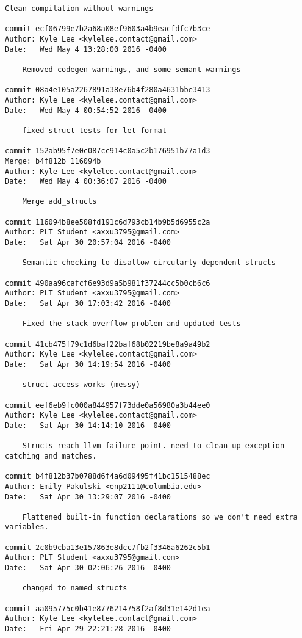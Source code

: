 \begin{lstlisting}[backgroundcolor=\color{white}]
    Clean compilation without warnings

commit ecf06799e7b2a68a08ef9603a4b9eacfdfc7b3ce
Author: Kyle Lee <kylelee.contact@gmail.com>
Date:   Wed May 4 13:28:00 2016 -0400

    Removed codegen warnings, and some semant warnings

commit 08a4e105a2267891a38e76b4f280a4631bbe3413
Author: Kyle Lee <kylelee.contact@gmail.com>
Date:   Wed May 4 00:54:52 2016 -0400

    fixed struct tests for let format

commit 152ab95f7e0c087cc914c0a5c2b176951b77a1d3
Merge: b4f812b 116094b
Author: Kyle Lee <kylelee.contact@gmail.com>
Date:   Wed May 4 00:36:07 2016 -0400

    Merge add_structs

commit 116094b8ee508fd191c6d793cb14b9b5d6955c2a
Author: PLT Student <axxu3795@gmail.com>
Date:   Sat Apr 30 20:57:04 2016 -0400

    Semantic checking to disallow circularly dependent structs

commit 490aa96cafcf6e93d9a5b981f37244cc5b0cb6c6
Author: PLT Student <axxu3795@gmail.com>
Date:   Sat Apr 30 17:03:42 2016 -0400

    Fixed the stack overflow problem and updated tests

commit 41cb475f79c1d6baf22baf68b02219be8a9a49b2
Author: Kyle Lee <kylelee.contact@gmail.com>
Date:   Sat Apr 30 14:19:54 2016 -0400

    struct access works (messy)

commit eef6eb9fc000a844957f73dde0a56980a3b44ee0
Author: Kyle Lee <kylelee.contact@gmail.com>
Date:   Sat Apr 30 14:14:10 2016 -0400

    Structs reach llvm failure point. need to clean up exception catching and matches.

commit b4f812b37b0788d6f4a6d09495f41bc1515488ec
Author: Emily Pakulski <enp2111@columbia.edu>
Date:   Sat Apr 30 13:29:07 2016 -0400

    Flattened built-in function declarations so we don't need extra variables.

commit 2c0b9cba13e157863e8dcc7fb2f3346a6262c5b1
Author: PLT Student <axxu3795@gmail.com>
Date:   Sat Apr 30 02:06:26 2016 -0400

    changed to named structs

commit aa095775c0b41e8776214758f2af8d31e142d1ea
Author: Kyle Lee <kylelee.contact@gmail.com>
Date:   Fri Apr 29 22:21:28 2016 -0400


\end{lstlisting}
